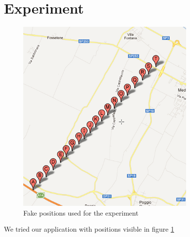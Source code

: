 \section{Experiment}
	\begin{figure}[htbp]
	\centering
	\includegraphics[width=3.5in]{imgs/punti_mappa.png}
	\caption{Fake positions used for the experiment}
	\label{fig:positions_experiment}
	\end{figure}
	We tried our application with positions visible in figure \ref{fig:positions_experiment}
